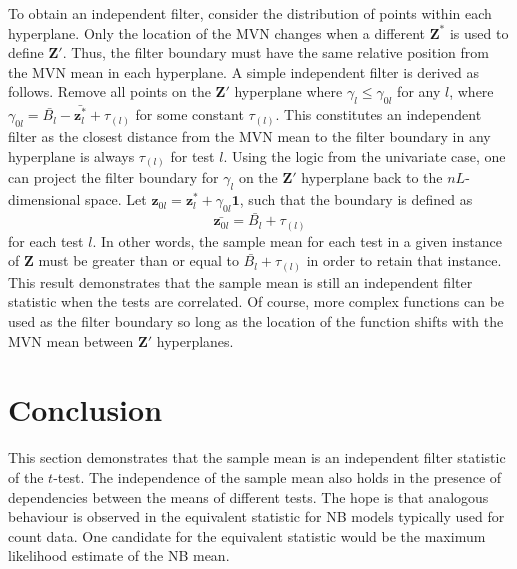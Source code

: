 \documentclass{article}
\newcommand{\nsamples}{n}
\newcommand{\modifier}{\gamma}
\newcommand{\logcount}{z}
\newcommand{\oriobs}[0]{\mathbf{\logcount}}
\newcommand{\instance}[0]{\mathbf{\logcount}^*}
\newcommand{\allones}[0]{\mathbf{1}}
\newcommand{\obsmat}[0]{\mathbf{Z}}
\newcommand{\matinst}[0]{\mathbf{Z^*}}
\newcommand{\modmat}[0]{\mathbf{Z}'}
\newcommand{\test}{l}
\newcommand{\ntests}{L}
\newcommand{\interceptor}{B}
\newcommand{\meanintercept}{\bar{\interceptor_\test}}
\newcommand{\dt}{\modifier_\test}
\newcommand{\testinstance}[0]{\instance_\test}
\newcommand{\testmodlimit}{\modifier_{0\test}}
\newcommand{\testthreshold}{\threshold_{(\test)}}
\newcommand{\testfilter}{\oriobs_{0\test}}
\newcommand{\threshold}{\tau}
\begin{document}
To obtain an independent filter, consider the distribution of points within each hyperplane.
Only the location of the MVN changes when a different $\matinst$ is used to define $\modmat$.
Thus, the filter boundary must have the same relative position from the MVN mean in each hyperplane.
A simple independent filter is derived as follows.
Remove all points on the $\modmat$ hyperplane where $\dt \le \testmodlimit$ for any $\test$, where $\testmodlimit = \meanintercept -\bar{\testinstance} + \testthreshold$ for some constant $\testthreshold$.
This constitutes an independent filter as the closest distance from the MVN mean to the filter boundary in any hyperplane is always $\testthreshold$ for test $\test$.
Using the logic from the univariate case, one can project the filter boundary for $\dt$ on the $\modmat$ hyperplane back to the $\nsamples\ntests$-dimensional space.
Let $\testfilter = \testinstance + \testmodlimit\allones$, such that the boundary is defined as
\[
\bar{\testfilter} = \meanintercept + \testthreshold
\]
for each test $\test$.
In other words, the sample mean for each test in a given instance of $\obsmat$ must be greater than or equal to $\meanintercept + \testthreshold$ in order to retain that instance.
This result demonstrates that the sample mean is still an independent filter statistic when the tests are correlated.
Of course, more complex functions can be used as the filter boundary so long as the location of the function shifts with the MVN mean between $\modmat$ hyperplanes.


\section{Conclusion}
This section demonstrates that the sample mean is an independent filter statistic of the $t$-test.
The independence of the sample mean also holds in the presence of dependencies between the means of different tests.
The hope is that analogous behaviour is observed in the equivalent statistic for NB models typically used for count data.
One candidate for the equivalent statistic would be the maximum likelihood estimate of the NB mean.
\end{document}
